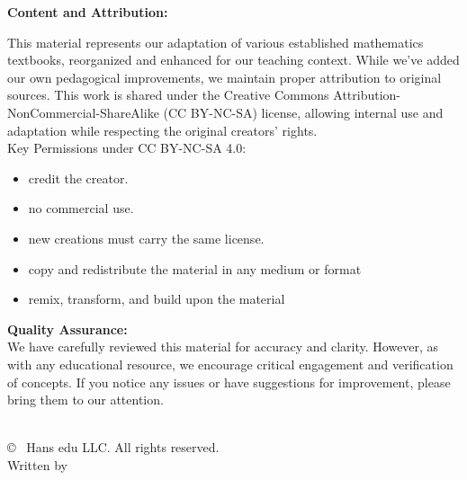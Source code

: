 \begin{center}
\begin{minipage}{0.85\textwidth}
    {\small\textbf{Content and Attribution:}}\\[0.2cm]
    {\footnotesize
    This material represents our adaptation of various established mathematics 
    textbooks, reorganized and enhanced for our teaching context. While we've 
    added our own pedagogical improvements, we maintain proper attribution to 
    original sources. This work is shared under the Creative Commons 
    Attribution-NonCommercial-ShareAlike (CC BY-NC-SA) license, allowing 
    internal use and adaptation while respecting the original creators' rights.\\[0.2cm]
    \small Key Permissions under CC BY-NC-SA 4.0:
    \begin{itemize}
      \item credit the creator.
      \item no commercial use.
      \item new creations must carry the same license.
      \item copy and redistribute the material in any medium or format
      \item remix, transform, and build upon the material
    \end{itemize}}
    {\small\textbf{Quality Assurance:}}\\[0.2cm]
    {\footnotesize
    We have carefully reviewed this material for accuracy and clarity. However, 
    as with any educational resource, we encourage critical engagement and 
    verification of concepts. If you notice any issues or have suggestions for 
    improvement, please bring them to our attention.}
  \end{minipage}
  \vspace{2cm} \\
  {\small © \the\year\ Hans edu LLC. All rights reserved.}\\[0.5cm]
  {\small Written by \BookAuthor}\\[1cm]
\end{center}

\newpage
